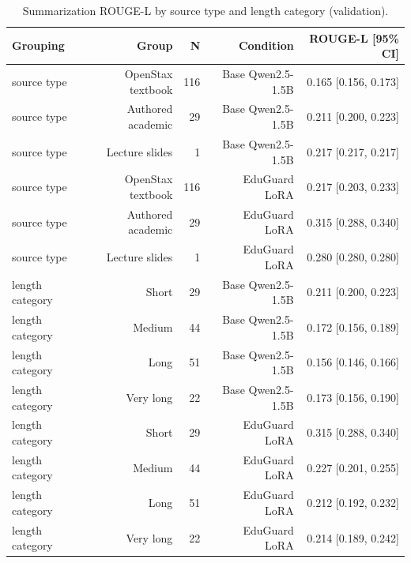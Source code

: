 \begin{table}[t]
\centering
\caption{Summarization ROUGE-L by source type and length category (validation).}
\label{tab:t5_summarization_breakdown}
\begin{tabular}{lrrrr}
\toprule
Grouping & Group & N & Condition & ROUGE-L [95\% CI] \\
\midrule
source type & OpenStax textbook & 116 & Base Qwen2.5-1.5B & 0.165 [0.156, 0.173] \\
source type & Authored academic & 29 & Base Qwen2.5-1.5B & 0.211 [0.200, 0.223] \\
source type & Lecture slides & 1 & Base Qwen2.5-1.5B & 0.217 [0.217, 0.217] \\
source type & OpenStax textbook & 116 & EduGuard LoRA & 0.217 [0.203, 0.233] \\
source type & Authored academic & 29 & EduGuard LoRA & 0.315 [0.288, 0.340] \\
source type & Lecture slides & 1 & EduGuard LoRA & 0.280 [0.280, 0.280] \\
length category & Short & 29 & Base Qwen2.5-1.5B & 0.211 [0.200, 0.223] \\
length category & Medium & 44 & Base Qwen2.5-1.5B & 0.172 [0.156, 0.189] \\
length category & Long & 51 & Base Qwen2.5-1.5B & 0.156 [0.146, 0.166] \\
length category & Very long & 22 & Base Qwen2.5-1.5B & 0.173 [0.156, 0.190] \\
length category & Short & 29 & EduGuard LoRA & 0.315 [0.288, 0.340] \\
length category & Medium & 44 & EduGuard LoRA & 0.227 [0.201, 0.255] \\
length category & Long & 51 & EduGuard LoRA & 0.212 [0.192, 0.232] \\
length category & Very long & 22 & EduGuard LoRA & 0.214 [0.189, 0.242] \\
\bottomrule
\end{tabular}
\end{table}

